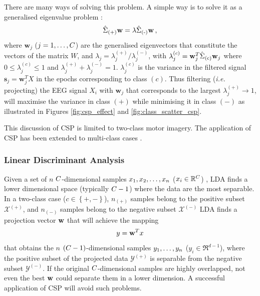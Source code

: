 There are many ways of solving this problem. A simple way is to solve it as a generalised eigenvalue problem \citep{koles_spatial_1990, blankertz_optimizing_2008}:
\begin{equation}
\label{eq:csp_gen_eigen}
\cov{(+)} \mathbf{w}= \lambda \cov{(-)} \mathbf{w} \, ,
\end{equation}
where $\mathbf{w}_j$ ($j=1, \dots, C$) are the generalised eigenvectors that constitute the vectors of the matrix $W$, and $\lambda_j = \lambda_j^{(+)}/\lambda_j^{(-)}$, with $\lambda_j^{(c)} = \mathbf{w}_j^T \hat{\Sigma}_{\operatorname{(c)}}\mathbf{w}_j$ where $0 \leq \lambda_j^{(c)} \leq 1$ and $\lambda_j^{(+)} + \lambda_j^{(-)} = 1$. 
$\lambda_j^{(c)}$ is the variance in the filtered signal $\mathbf{s}_j = \mathbf{w}_j^T X$ in the epochs corresponding to class $(c)$.
Thus filtering (\textit{i.e.} projecting) the EEG signal $X_i$ with $\mathbf{w}_j$ that corresponds to the largest $\lambda_ j^{(+)} \rightarrow 1 $, will maximise the variance in class $(+)$ while minimising it in class $(-)$ as illustrated in Figures \ref{fig:csp_effect} and \ref{fig:class_scatter_csp}.

This discussion of CSP is limited to two-class motor imagery. The application of CSP has been extended to multi-class cases \citep{dornhege_increase_2004, grosse-wentrup_multiclass_2008}.

\subsubsection{Linear Discriminant Analysis}

Given a set of $n$ $C$-dimensional samples $x_1, x_2, \dots, x_n$ ($x_i \in \mathbb{R}^{C}$) , LDA finds a lower dimensional space (typically $C-1$) where the data are the most separable.
In a two-class case ($c \in \left\lbrace +, - \right\rbrace$), $n_{(+)}$ samples belong to the positive subset $\mathcal{X}^{(+)}$,
and $n_{(-)}$ samples belong to the negative subset $\mathcal{X}^{(-)}$
LDA finds a projection vector $\mathbf{w}$ that will achieve the mapping
\begin{equation}
y = \mathbf{w}^T x
\end{equation}
that obtains the $n$ $(C-1)$-dimensional samples $y_1, \dots, y_n$ ($y_i \in \Re^{d-1}$), where the positive subset of the projected data $\mathcal{Y}^{(+)}$ is separable from the negative subset $\mathcal{Y}^{(-)}$.
If the original $C$-dimensional samples are highly overlapped, not even the best $\mathbf{w}$ could separate them in a lower dimension. 
A successful application of CSP will avoid such problems.

